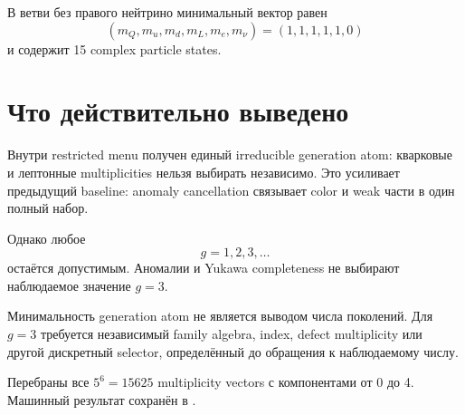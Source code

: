 В ветви без правого нейтрино минимальный вектор равен
\begin{equation}
(m_Q,m_u,m_d,m_L,m_e,m_\nu)=(1,1,1,1,1,0)
\end{equation}
и содержит 15 complex particle states.

\section{Что действительно выведено}

Внутри restricted menu получен единый irreducible generation atom:
кварковые и лептонные multiplicities нельзя выбирать независимо. Это
усиливает предыдущий baseline: anomaly cancellation связывает color и weak
части в один полный набор.

Однако любое
\begin{equation}
g=1,2,3,\ldots
\end{equation}
остаётся допустимым. Аномалии и Yukawa completeness не выбирают наблюдаемое
значение \(g=3\).

\begin{nogocriterion}
Минимальность generation atom не является выводом числа поколений. Для
\(g=3\) требуется независимый family algebra, index, defect multiplicity или
другой дискретный selector, определённый до обращения к наблюдаемому числу.
\end{nogocriterion}

Перебраны все \(5^6=15625\) multiplicity vectors с компонентами от 0 до 4.
Машинный результат сохранён в
.